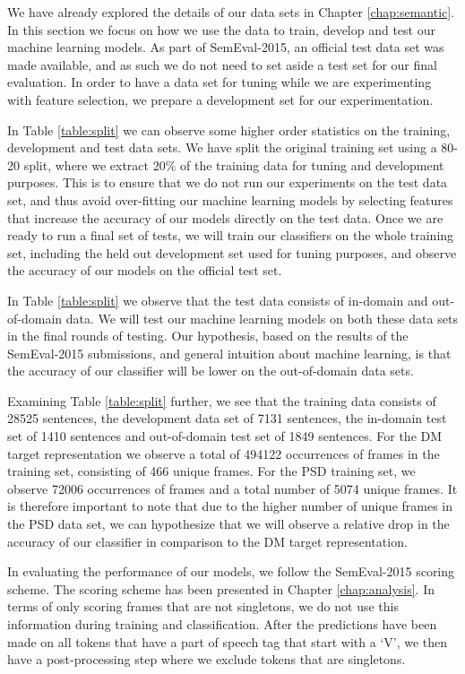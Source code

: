 We have already explored the details of our data sets in Chapter \ref{chap:semantic}. In this section we focus on how we use the data to train, develop and test our machine learning models. As part of SemEval-2015, an official test data set was made available, and as such we do not need to set aside a test set for our final evaluation. In order to have a data set for tuning while we are experimenting with feature selection, we prepare a development set for our experimentation.

In Table \ref{table:split} we can observe some higher order statistics on the training, development and test data sets. We have split the original training set using a 80-20 split, where we extract 20\% of the training data for tuning and development purposes. This is to ensure that we do not run our experiments on the test data set, and thus avoid over-fitting our machine learning models by selecting features that increase the accuracy of our models directly on the test data. Once we are ready to run a final set of tests, we will train our classifiers on the whole training set, including the held out development set used for tuning purposes, and observe the accuracy of our models on the official test set.

In Table \ref{table:split} we observe that the test data consists of in-domain and out-of-domain data. We will test our machine learning models on both these data sets in the final rounds of testing. Our hypothesis, based on the results of the SemEval-2015 submissions, and general intuition about machine learning, is that the accuracy of our classifier will be lower on the out-of-domain data sets.

Examining Table \ref{table:split} further, we see that the training data consists of 28525 sentences, the development data set of 7131 sentences, the in-domain test set of 1410 sentences and out-of-domain test set of 1849 sentences. For the DM target representation we observe a total of 494122 occurrences of frames in the training set, consisting of 466 unique frames. For the PSD training set, we observe 72006 occurrences of frames and a total number of 5074 unique frames. It is therefore important to note that due to the higher number of unique frames in the PSD data set, we can hypothesize that we will observe a relative drop in the accuracy of our classifier in comparison to the DM target representation.

In evaluating the performance of our models, we follow the SemEval-2015 scoring scheme. The scoring scheme has been presented in Chapter \ref{chap:analysis}. In terms of only scoring frames that are not singletons, we do not use this information during training and classification. After the predictions have been made on all tokens that have a part of speech tag that start with a `V', we then have a post-processing step where we exclude tokens that are singletons.

